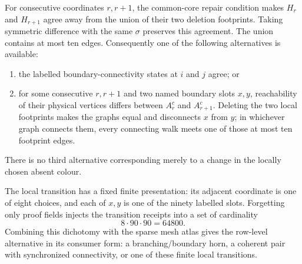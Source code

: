 \begin{corollary}
For consecutive coordinates $r,r+1$, the common-core repair condition makes
$H_r$ and $H_{r+1}$ agree away from the union of their two deletion
footprints.  Taking symmetric difference with the same $\sigma$ preserves
this agreement.  The union contains at most ten edges.  Consequently one of
the following alternatives is available:
\begin{enumerate}
  \item the labelled boundary-connectivity states at $i$ and $j$ agree; or
  \item for some consecutive $r,r+1$ and two named boundary slots $x,y$,
        reachability of their physical vertices differs between $A^c_r$ and
        $A^c_{r+1}$.  Deleting the two local footprints makes the graphs equal
        and disconnects $x$ from $y$; in whichever graph connects them, every
        connecting walk meets one of those at most ten footprint edges.
\end{enumerate}
There is no third alternative corresponding merely to a change in the
locally chosen absent colour.

The local transition has a fixed finite presentation: its adjacent coordinate
is one of eight choices, and each of $x,y$ is one of the ninety labelled
slots.  Forgetting only proof fields injects the transition receipts into a
set of cardinality
\[
                           8\cdot90\cdot90=64800.
\]
Combining this dichotomy with the sparse mesh atlas gives the row-level
alternative in its consumer form: a branching/boundary horn, a coherent pair
with synchronized connectivity, or one of these finite local transitions.
\end{corollary}

